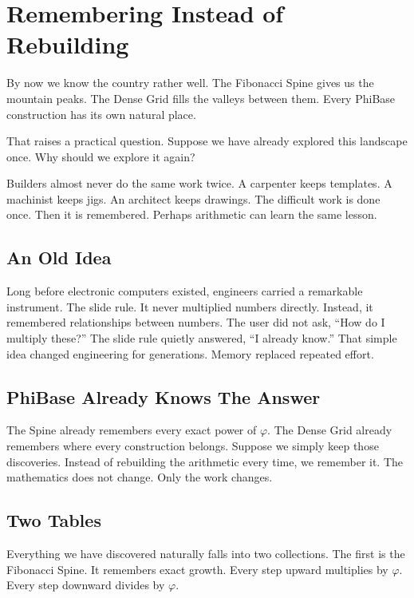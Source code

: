 \chapter{Remembering Instead of Rebuilding}
\label{stone:slide-rule}

By now we know the country rather well. The Fibonacci Spine gives us the mountain peaks. The Dense Grid fills the valleys between them. Every PhiBase construction has its own natural place.

That raises a practical question. Suppose we have already explored this landscape once. Why should we explore it again?

Builders almost never do the same work twice. A carpenter keeps templates. A machinist keeps jigs. An architect keeps drawings. The difficult work is done once. Then it is remembered. Perhaps arithmetic can learn the same lesson.

\section*{An Old Idea}

Long before electronic computers existed, engineers carried a remarkable instrument. The slide rule. It never multiplied numbers directly. Instead, it remembered relationships between numbers. The user did not ask, ``How do I multiply these?'' The slide rule quietly answered, ``I already know.'' That simple idea changed engineering for generations. Memory replaced repeated effort.

\section*{PhiBase Already Knows The Answer}

The Spine already remembers every exact power of \(\varphi\). The Dense Grid already remembers where every construction belongs. Suppose we simply keep those discoveries. Instead of rebuilding the arithmetic every time, we remember it. The mathematics does not change. Only the work changes.

\section*{Two Tables}

Everything we have discovered naturally falls into two collections. The first is the Fibonacci Spine. It remembers exact growth. Every step upward multiplies by \(\varphi\). Every step downward divides by \(\varphi\).

